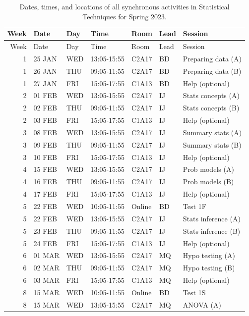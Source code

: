 \documentclass[
]{scrbook}
\begin{document}
\begin{longtable}[]{@{}rllllll@{}}
\caption{\label{tab:unnamed-chunk-1}Dates, times, and locations of all synchronous activities in Statistical Techniques for Spring 2023.}\tabularnewline
\toprule
Week & Date & Day & Time & Room & Lead & Session \\
\midrule
\endfirsthead
\toprule
Week & Date & Day & Time & Room & Lead & Session \\
\midrule
\endhead
1 & 25 JAN & WED & 13:05-15:55 & C2A17 & BD & Preparing data (A) \\
1 & 26 JAN & THU & 09:05-11:55 & C2A17 & BD & Preparing data (B) \\
1 & 27 JAN & FRI & 15:05-17:55 & C1A13 & BD & Help (optional) \\
2 & 01 FEB & WED & 13:05-15:55 & C2A17 & IJ & Stats concepts (A) \\
2 & 02 FEB & THU & 09:05-11:55 & C2A17 & IJ & Stats concepts (B) \\
2 & 03 FEB & FRI & 15:05-17:55 & C1A13 & IJ & Help (optional) \\
3 & 08 FEB & WED & 13:05-15:55 & C2A17 & IJ & Summary stats (A) \\
3 & 09 FEB & THU & 09:05-11:55 & C2A17 & IJ & Summary stats (B) \\
3 & 10 FEB & FRI & 15:05-17:55 & C1A13 & IJ & Help (optional) \\
4 & 15 FEB & WED & 13:05-15:55 & C2A17 & IJ & Prob models (A) \\
4 & 16 FEB & THU & 09:05-11:55 & C2A17 & IJ & Prob models (B) \\
4 & 17 FEB & FRI & 15:05-17:55 & C1A13 & IJ & Help (optional) \\
5 & 22 FEB & WED & 10:05-11:55 & Online & BD & Test 1F \\
5 & 22 FEB & WED & 13:05-15:55 & C2A17 & IJ & Stats inference (A) \\
5 & 23 FEB & THU & 09:05-11:55 & C2A17 & IJ & Stats inference (B) \\
5 & 24 FEB & FRI & 15:05-17:55 & C1A13 & IJ & Help (optional) \\
6 & 01 MAR & WED & 13:05-15:55 & C2A17 & MQ & Hypo testing (A) \\
6 & 02 MAR & THU & 09:05-11:55 & C2A17 & MQ & Hypo testing (B) \\
6 & 03 MAR & FRI & 15:05-17:55 & C1A13 & MQ & Help (optional) \\
8 & 15 MAR & WED & 10:05-11:55 & Online & BD & Test 1S \\
8 & 15 MAR & WED & 13:05-15:55 & C2A17 & MQ & ANOVA (A) \\

\end{longtable}
\end{document}
